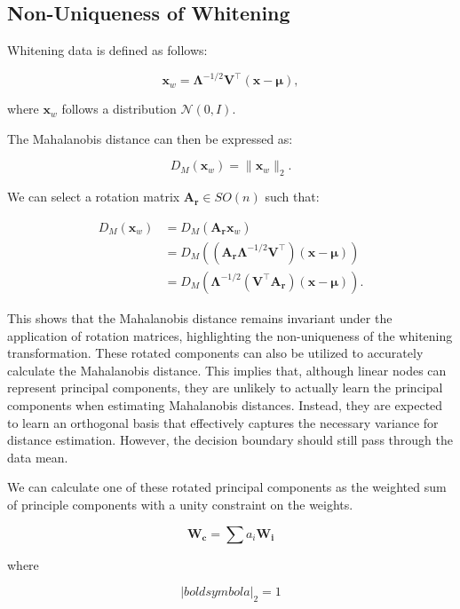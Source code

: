 \subsection{Non-Uniqueness of Whitening}

Whitening data is defined as follows:

\[
\mathbf{x}_w = \boldsymbol{\Lambda}^{-1/2} \mathbf{V}^\top (\mathbf{x} - \boldsymbol{\mu}),
\]

where \(\mathbf{x}_w\) follows a distribution \(\mathcal{N}(0, I)\).

The Mahalanobis distance can then be expressed as:

\[
D_M(\mathbf{x}_w) = \|\mathbf{x}_w\|_2.
\]

We can select a rotation matrix \(\mathbf{A_r} \in SO(n)\) such that:

\begin{align}
    D_M(\mathbf{x}_w) &= D_M(\mathbf{A_r} \mathbf{x}_w) \\
                      &= D_M\left( (\mathbf{A_r} \boldsymbol{\Lambda}^{-1/2} \mathbf{V}^\top) (\mathbf{x} - \boldsymbol{\mu}) \right) \\
                      &= D_M\left( \boldsymbol{\Lambda}^{-1/2} (\mathbf{V}^\top \mathbf{A_r}) (\mathbf{x} - \boldsymbol{\mu}) \right).
    \end{align}
    
This shows that the Mahalanobis distance remains invariant under the application of rotation matrices, highlighting the non-uniqueness of the whitening transformation. These rotated components can also be utilized to accurately calculate the Mahalanobis distance. This implies that, although linear nodes can represent principal components, they are unlikely to actually learn the principal components when estimating Mahalanobis distances. Instead, they are expected to learn an orthogonal basis that effectively captures the necessary variance for distance estimation. However, the decision boundary should still pass through the data mean.

We can calculate one of these rotated principal components as the weighted sum of principle components with a unity constraint on the weights.

\begin{equation}
    \label{eq:pc_mixture}
    \boldsymbol{W_c} = \sum a_i \mathbf{W_i}
\end{equation}

where

\begin{equation}
    \label{eq:pc_mixture_constraint}
    \left| boldsymbol{a} \right|_2 = 1
\end{equation}

